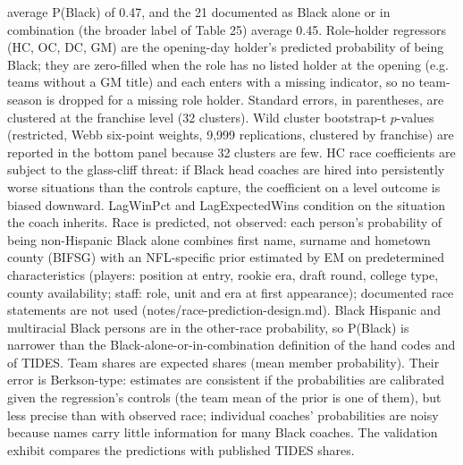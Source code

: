 {average P(Black) of 0.47, and the 21 documented as Black alone or in combination (the broader label of Table 25) average 0.45. Role-holder regressors (HC, OC, DC, GM) are the opening-day holder's predicted probability of being Black; they are zero-filled when the role has no listed holder at the opening (e.g. teams without a GM title) and each enters with a missing indicator, so no team-season is dropped for a missing role holder. Standard errors, in parentheses, are clustered at the franchise level (32 clusters). Wild cluster bootstrap-t $p$-values (restricted, Webb six-point weights, 9,999 replications, clustered by franchise) are reported in the bottom panel because 32 clusters are few. HC race coefficients are subject to the glass-cliff threat: if Black head coaches are hired into persistently worse situations than the controls capture, the coefficient on a level outcome is biased downward. LagWinPct and LagExpectedWins condition on the situation the coach inherits. Race is predicted, not observed: each person's probability of being non-Hispanic Black alone combines first name, surname and hometown county (BIFSG) with an NFL-specific prior estimated by EM on predetermined characteristics (players: position at entry, rookie era, draft round, college type, county availability; staff: role, unit and era at first appearance); documented race statements are not used (notes/race-prediction-design.md). Black Hispanic and multiracial Black persons are in the other-race probability, so P(Black) is narrower than the Black-alone-or-in-combination definition of the hand codes and of TIDES. Team shares are expected shares (mean member probability). Their error is Berkson-type: estimates are consistent if the probabilities are calibrated given the regression's controls (the team mean of the prior is one of them), but less precise than with observed race; individual coaches' probabilities are noisy because names carry little information for many Black coaches. The validation exhibit compares the predictions with published TIDES shares.
\par}

